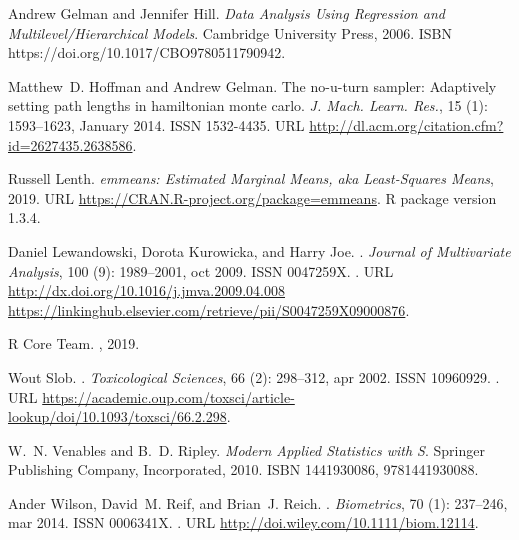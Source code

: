 \documentclass[11pt]{biorxiv}
\begin{document}
\begin{thebibliography}{14}
Andrew Gelman and Jennifer Hill.
\newblock \emph{{Data Analysis Using Regression and Multilevel/Hierarchical
  Models}}.
\newblock Cambridge University Press, 2006.
\newblock ISBN https://doi.org/10.1017/CBO9780511790942.

Matthew~D. Hoffman and Andrew Gelman.
\newblock The no-u-turn sampler: Adaptively setting path lengths in hamiltonian
  monte carlo.
\newblock \emph{J. Mach. Learn. Res.}, 15 (1): 1593--1623,
  January 2014.
\newblock ISSN 1532-4435.
\newblock URL \url{http://dl.acm.org/citation.cfm?id=2627435.2638586}.

Russell Lenth.
\newblock \emph{emmeans: Estimated Marginal Means, aka Least-Squares Means},
  2019.
\newblock URL \url{https://CRAN.R-project.org/package=emmeans}.
\newblock R package version 1.3.4.

Daniel Lewandowski, Dorota Kurowicka, and Harry Joe.
.
\newblock \emph{Journal of Multivariate Analysis}, 100 (9):
  1989--2001, oct 2009.
\newblock ISSN 0047259X.
\newblock {}.
\newblock URL \url{http://dx.doi.org/10.1016/j.jmva.2009.04.008
  https://linkinghub.elsevier.com/retrieve/pii/S0047259X09000876}.

{R Core Team}.
, 2019.

Wout Slob.
.
\newblock \emph{Toxicological Sciences}, 66 (2): 298--312,
  apr 2002.
\newblock ISSN 10960929.
\newblock {}.
\newblock URL
  \url{https://academic.oup.com/toxsci/article-lookup/doi/10.1093/toxsci/66.2.298}.

W.~N. Venables and B.~D. Ripley.
\newblock \emph{Modern Applied Statistics with S}.
\newblock Springer Publishing Company, Incorporated, 2010.
\newblock ISBN 1441930086, 9781441930088.

Ander Wilson, David~M. Reif, and Brian~J. Reich.
.
\newblock \emph{Biometrics}, 70 (1): 237--246, mar 2014.
\newblock ISSN 0006341X.
\newblock {}.
\newblock URL \url{http://doi.wiley.com/10.1111/biom.12114}.

\end{thebibliography}
\end{document}
